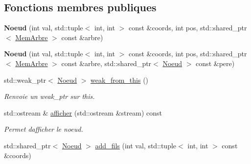 \subsection*{Fonctions membres publiques}
\begin{DoxyCompactItemize}
\item 
{\bfseries Noeud} (int val, std\+::tuple$<$ int, int $>$ const \&coords, int pos, std\+::shared\+\_\+ptr$<$ \hyperlink{classMemArbre}{Mem\+Arbre} $>$ const \&arbre)\hypertarget{classMemArbre_1_1Noeud_a8fb60f07cdaa6c159102b5c28ccd904f}{}\label{classMemArbre_1_1Noeud_a8fb60f07cdaa6c159102b5c28ccd904f}

\item 
{\bfseries Noeud} (int val, std\+::tuple$<$ int, int $>$ const \&coords, int pos, std\+::shared\+\_\+ptr$<$ \hyperlink{classMemArbre}{Mem\+Arbre} $>$ const \&arbre, std\+::shared\+\_\+ptr$<$ \hyperlink{classMemArbre_1_1Noeud}{Noeud} $>$ const \&pere)\hypertarget{classMemArbre_1_1Noeud_a96ab7701e3ac3a755c66e2332f69cd7d}{}\label{classMemArbre_1_1Noeud_a96ab7701e3ac3a755c66e2332f69cd7d}

\item 
std\+::weak\+\_\+ptr$<$ \hyperlink{classMemArbre_1_1Noeud}{Noeud} $>$ \hyperlink{classMemArbre_1_1Noeud_a4639b419945fdb26f7ba9c967559bcf3}{weak\+\_\+from\+\_\+this} ()\hypertarget{classMemArbre_1_1Noeud_a4639b419945fdb26f7ba9c967559bcf3}{}\label{classMemArbre_1_1Noeud_a4639b419945fdb26f7ba9c967559bcf3}

\begin{DoxyCompactList}\small\item\em Renvoie un weak\+\_\+ptr sur this. \end{DoxyCompactList}\item 
std\+::ostream \& \hyperlink{classMemArbre_1_1Noeud_ae5c5794ad07ff855c5e472f10c890c38}{afficher} (std\+::ostream \&stream) const \hypertarget{classMemArbre_1_1Noeud_ae5c5794ad07ff855c5e472f10c890c38}{}\label{classMemArbre_1_1Noeud_ae5c5794ad07ff855c5e472f10c890c38}

\begin{DoxyCompactList}\small\item\em Permet d\textquotesingle{}afficher le noeud. \end{DoxyCompactList}\item 
std\+::shared\+\_\+ptr$<$ \hyperlink{classMemArbre_1_1Noeud}{Noeud} $>$ \hyperlink{classMemArbre_1_1Noeud_a738b4af9c935bc05dac33f4c48bed0cf}{add\+\_\+fils} (int val, std\+::tuple$<$ int, int $>$ const \&coords)\hypertarget{classMemArbre_1_1Noeud_a738b4af9c935bc05dac33f4c48bed0cf}{}\label{classMemArbre_1_1Noeud_a738b4af9c935bc05dac33f4c48bed0cf}


\end{DoxyCompactItemize}
